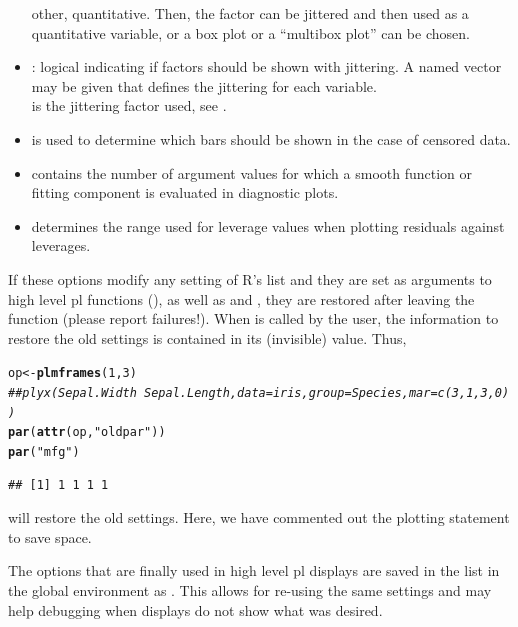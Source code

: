 \documentclass[11pt]{article}\usepackage[]{graphicx}\usepackage[]{color}
\makeatletter
\newcommand{\hlnum}[1]{\textcolor[rgb]{0.686,0.059,0.569}{#1}}%
\newcommand{\hlstr}[1]{\textcolor[rgb]{0.192,0.494,0.8}{#1}}%
\newcommand{\hlcom}[1]{\textcolor[rgb]{0.678,0.584,0.686}{\textit{#1}}}%
\newcommand{\hlstd}[1]{\textcolor[rgb]{0.345,0.345,0.345}{#1}}%
\newcommand{\hlkwb}[1]{\textcolor[rgb]{0.69,0.353,0.396}{#1}}%
\newcommand{\hlkwd}[1]{\textcolor[rgb]{0.737,0.353,0.396}{\textbf{#1}}}%
\newenvironment{kframe}{%
 \def\at@end@of@kframe{}%
 \ifinner\ifhmode%
  \def\at@end@of@kframe{\end{minipage}}%
  \begin{minipage}{\columnwidth}%
 \fi\fi%
 \def\FrameCommand##1{\hskip\@totalleftmargin \hskip-\fboxsep
 \colorbox{shadecolor}{##1}\hskip-\fboxsep
     \hskip-\linewidth \hskip-\@totalleftmargin \hskip\columnwidth}%
 \MakeFramed {\advance\hsize-\width
   \@totalleftmargin\z@ \linewidth\hsize
   \@setminipage}}%
 {\par\unskip\endMakeFramed%
 \at@end@of@kframe}
\newenvironment{knitrout}{}{} %
\makeatother
\begin{document}
\begin{itemize}
  other, quantitative. Then, the factor can be jittered and then used
  as a quantitative variable, or a box plot or a ``multibox plot'' can be 
  chosen.
\item
  : logical indicating if factors should be shown with jittering.
  A named vector may be given that defines the jittering for each
  variable.\\ 
   is the jittering factor used, see .
\item
   is used to determine which bars should be shown
  in the case of censored data.
\item
   contains the number of argument values for which 
  a smooth function or fitting component is evaluated in diagnostic plots.
\item
   determines the range used for leverage values
  when plotting residuals against leverages.
\end{itemize}

If these options modify any setting of R's  list and they are 
set as arguments to high level pl functions 
(), as well as 
 and ,
they are restored after leaving the function (please report failures!).
When  is called by the user, the information to restore 
the old settings is contained in its (invisible) value.
Thus, 
\begin{knitrout}
\color{fgcolor}\begin{kframe}
\begin{alltt}
\hlstd{op} \hlkwb{<-} \hlkwd{plmframes}\hlstd{(}\hlnum{1}\hlstd{,}\hlnum{3}\hlstd{)}
\hlcom{## plyx(Sepal.Width~Sepal.Length, data=iris, group=Species, mar=c(3,1,3,0))}
\hlkwd{par}\hlstd{(}\hlkwd{attr}\hlstd{(op,} \hlstr{"oldpar"}\hlstd{))}
\hlkwd{par}\hlstd{(}\hlstr{"mfg"}\hlstd{)}
\end{alltt}
\begin{verbatim}
## [1] 1 1 1 1
\end{verbatim}
\end{kframe}
\end{knitrout}
will restore the old settings. Here, we have commented out the plotting
statement to save space.

The options that are finally used in high level pl displays are saved 
in the list  in the global environment as
.
This allows for re-using the same settings and may help debugging when
displays do not show what was desired.
\end{document}
